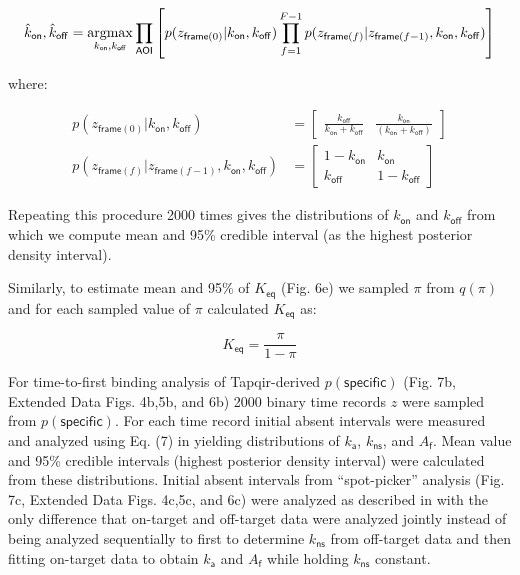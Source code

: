 \begin{equation}
    \hat{k}_\mathsf{on}, \hat{k}_\mathsf{off} = \operatorname*{argmax}_{k_\mathsf{on}, k_\mathsf{off}} \prod_\mathsf{AOI} \left[ p(z_{\mathsf{frame}(0)} | k_\mathsf{on}, k_\mathsf{off}) \prod_{f=1}^{F-1} p(z_{\mathsf{frame}(f)} | z_{\mathsf{frame}(f-1)}, k_\mathsf{on}, k_\mathsf{off}) \right]
\end{equation}

where:

\begin{subequations}
\begin{align}
    p(z_{\mathsf{frame}(0)} | k_\mathsf{on}, k_\mathsf{off}) &= \begin{bmatrix} \frac{k_\mathsf{off}}{k_\mathsf{on} + k_\mathsf{off}} & \frac{k_\mathsf{on}}{\left( k_\mathsf{on} + k_\mathsf{off} \right)} \end{bmatrix} \\
    p(z_{\mathsf{frame}(f)} | z_{\mathsf{frame}(f-1)}, k_\mathsf{on}, k_\mathsf{off}) &= \begin{bmatrix} 1 - k_\mathsf{on} & k_\mathsf{on} \\ k_\mathsf{off} & 1 - k_\mathsf{off} \end{bmatrix}
\end{align}
\end{subequations}

Repeating this procedure 2000 times gives the distributions of $k_\mathsf{on}$ and $k_\mathsf{off}$ from which we compute mean and 95\% credible interval (as the highest posterior density interval).

Similarly, to estimate mean and 95\% of $K_\mathsf{eq}$ (Fig. 6e) we sampled $\pi$ from $q(\pi)$ and for each sampled value of $\pi$ calculated $K_\mathsf{eq}$ as:

\begin{equation}
    K_\mathsf{eq} = \dfrac{\pi}{1 - \pi}
\end{equation}

For time-to-first binding analysis of Tapqir-derived $p(\mathsf{specific})$ (Fig. 7b, Extended Data Figs. 4b,5b, and 6b) 2000 binary time records $z$ were sampled from $p(\mathsf{specific})$. For each time record initial absent intervals were measured and analyzed using Eq. (7) in \cite{Friedman2015-nx} yielding distributions of $k_\mathsf{a}$, $k_\mathsf{ns}$, and $A_\mathsf{f}$. Mean value and 95\% credible intervals (highest posterior density interval) were calculated from these distributions. Initial absent intervals from ``spot-picker'' analysis (Fig. 7c, Extended Data Figs. 4c,5c, and 6c) were analyzed as described in \cite{Friedman2015-nx} with the only difference that on-target and off-target data were analyzed jointly instead of being analyzed sequentially to first to determine $k_\mathsf{ns}$ from off-target data and then fitting on-target data to obtain $k_\mathsf{a}$ and $A_\mathsf{f}$ while holding $k_\mathsf{ns}$ constant.




